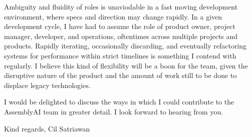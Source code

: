 \documentclass[11pt]{article}
\begin{document}
Ambiguity and fluidity of roles is unaviodable in a fast moving development
environment, where specs and direction may change rapidly. In a given
development cycle, I have had to assume the role of product owner, project
manager, developer, and operations, oftentimes across multiple projects and
products. Rapidly iterating, occasionally discarding, and eventually refactoring
systems for performance within strict timelines is something I contend with
regularly. I believe this kind of flexibility will be a boon for the team, given
the disruptive nature of the product and the amount of work still to be done to
displace legacy technologies.
\vspace{3mm}

I would be delighted to discuss the ways in which I could contribute to the
AssemblyAI team in greater detail. I look forward to hearing from you.
\vspace{3mm}

Kind regards,\newline
Cil Satriawan

\ 
\end{document}
